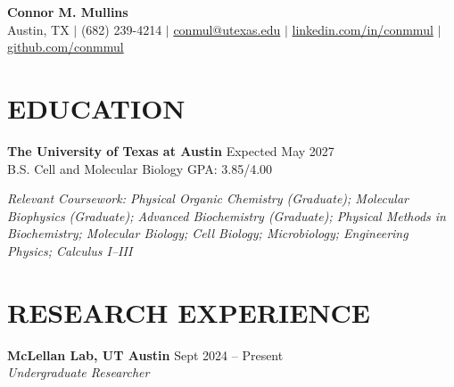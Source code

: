 \documentclass[11pt]{article}
\newcommand{\resumeSubheading}[4]{
\textbf{#1} \hfill #2\\
\textit{#3} \hfill \textit{#4}
}
\begin{document}

\begin{center}
{\Large \textbf{Connor M. Mullins}}\\[4pt]

{\small Austin, TX \hspace{6pt}$\vert$\hspace{6pt}
(682) 239-4214 \hspace{6pt}$\vert$\hspace{6pt}
\href{mailto:conmul@utexas.edu}{conmul@utexas.edu}
\hspace{6pt}$\vert$\hspace{6pt}
\href{https://www.linkedin.com/in/conmmul/}{linkedin.com/in/conmmul}
\hspace{6pt}$\vert$\hspace{6pt}
\href{https://github.com/conmmul}{github.com/conmmul}}
\end{center}


\section*{EDUCATION}

\textbf{The University of Texas at Austin} \hfill Expected May 2027\\
B.S. Cell and Molecular Biology \hfill GPA: 3.85/4.00

\textit{Relevant Coursework: Physical Organic Chemistry (Graduate); Molecular Biophysics (Graduate); Advanced Biochemistry (Graduate); Physical Methods in Biochemistry; Molecular Biology; Cell Biology; Microbiology; Engineering Physics; Calculus I--III}


\section*{RESEARCH EXPERIENCE}

\resumeSubheading
{McLellan Lab, UT Austin}
{Sept 2024 -- Present}
{Undergraduate Researcher}
{}
\end{document}
